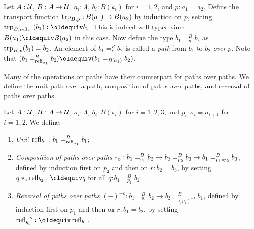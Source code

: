 \documentclass[a4paper,12pt]{amsart}
\begin{document}
\begin{definition}\label{def:pathover}
Let $A : \mathcal{U}$, $B : A \to \mathcal{U}$, $a_i:A$, $b_i:B(a_i)$ for $i=1,2$, and $p : a_1 = a_2$.
Define the transport function $\mathop{\mathrm{trp}_{B,p}} : B(a_1)\to B(a_2)$ by induction on $p$,
setting $\trp{B,\refl{a_1}}(b_1)\defeq b_1$. This is indeed well-typed since
$B(a_1)\jdeq B(a_2)$ in this case.
Now define the type $b_1 =^B_p b_2$ as $\mathop{\mathrm{trp}_{B,p}}(b_1) = b_2$.
An element of $b_1 =^B_p b_2$ is called
a \emph{path} from $b_1$ to $b_2$ \emph{over} $p$.
Note that $(b_1 =^B_{\refl{a_1}} b_2) \jdeq (b_1 =_{B(a_1)}  b_2)$.
\end{definition}

Many of the operations on paths have their counterpart for paths over paths.
We define the unit path over a path, composition of paths over paths, and reversal of paths over paths.

\begin{definition}\label{def:pathoveralgebra}
  Let $A : \mathcal{U}$, $B : A \to \mathcal{U}$, $a_i:A$, $b_i:B(a_i)$ for $i=1,2,3$, and
  $p_i : a_i = a_{i+1}$ for $i=1,2$. We define:
  \begin{enumerate}[topsep=3pt]
  \item \emph{Unit} $\mathop{{\mathrm{refl}}_{b_1}} : b_1 =^B_{\mathop{{\mathrm{refl}}_{a_1}}} b_1$;
  \item \emph{Composition of paths over paths} $*_{\mathrm{o}} : b_1 =^B_{p_1} b_2 \to b_2 =^B_{p_2} b_3 \to b_1 =^B_{p_1 * p_2} b_3$,
    defined by induction first on $p_2$ and then on $r: b_2 = b_3$, by
    setting $q \cto \refl{b_2} \defeq q$ for all $q: b_1 =^B_{p_1} b_2$;
  \item \emph{Reversal of paths over paths} $({-})^{-o} : b_1 =^B_{p_1} b_2 \to b_2 =^B_{(p_1)^{-1}} b_1$,
    defined by induction first on $p_1$ and then on $r: b_1 = b_2$, by
    setting $\refloi{b_1} \defeq \refl{b_1}$.
  \end{enumerate}
\end{definition}
\end{document}
